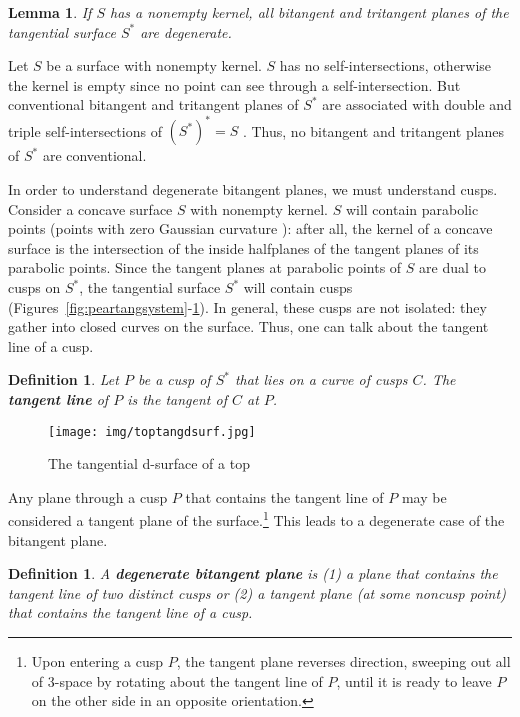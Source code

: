 \documentclass[12pt]{article}
\newcommand{\QED}{\vrule height 1.4ex width 1.0ex depth -.1ex\ \vspace{.3in}} %
\newcommand{\prf}{\noindent{{\bf Proof}:\ \ \ }}
\newtheorem{lemma}[theorem]{Lemma}
\newtheorem{defn2}[theorem]{Definition}
\begin{document}
\begin{lemma}
\label{lem:degenerate}
If $S$ has a nonempty kernel,
all bitangent and tritangent planes of the tangential surface $S^*$ are 
degenerate.
\end{lemma}
\prf
Let $S$ be a surface with nonempty kernel.
$S$ has no self-intersections, otherwise the kernel is empty
since no point can see through a self-intersection.
But conventional bitangent and tritangent planes of $S^*$ are associated
with double and triple self-intersections of $(S^*)^* = S$ \cite{jj02,jj03tangsurf}.
Thus, no bitangent and tritangent planes of $S^*$ are conventional.
\QED

In order to understand degenerate bitangent planes, we must understand cusps.
Consider a concave
surface $S$ with nonempty kernel.
$S$ will contain parabolic points (points with zero Gaussian curvature \cite{struik}):
after all, the kernel of a concave surface is the intersection of the inside
halfplanes of the tangent planes of its parabolic points.
Since the tangent planes at parabolic points of $S$ are dual to cusps on $S^*$,
the tangential surface $S^*$ will contain cusps 
(Figures~\ref{fig:peartangsystem}-\ref{fig:toptangdsurf}).
In general, these cusps are not isolated: they gather into closed curves on the surface.
Thus, one can talk about the tangent line of a cusp.

\begin{defn2}
\label{defn:tangline}
Let $P$ be a cusp of $S^*$ that lies on a curve of cusps $C$.
The {\bf tangent line} of $P$ is the tangent of $C$ at $P$.
\end{defn2}

\begin{figure}
\begin{center}
\texttt{[image: img/toptangdsurf.jpg]}
\end{center}
\caption{The tangential d-surface of a top}
\label{fig:toptangdsurf}
\end{figure}

Any plane through a cusp $P$ that contains the tangent line of $P$ may be considered
a tangent plane of the surface.\footnote{Upon entering a cusp $P$, 
	the tangent plane reverses direction, sweeping out all of 3-space 
	by rotating about the tangent line of $P$,
	until it is ready to leave $P$ on the other side in an opposite orientation.}
This leads to a degenerate case of the bitangent plane.

\begin{defn2}
A {\bf degenerate bitangent plane} is 
(1) a plane that contains the tangent line of two distinct cusps or
(2) a tangent plane (at some noncusp point) that contains the tangent line of a cusp. 
\end{defn2}
\end{document}
